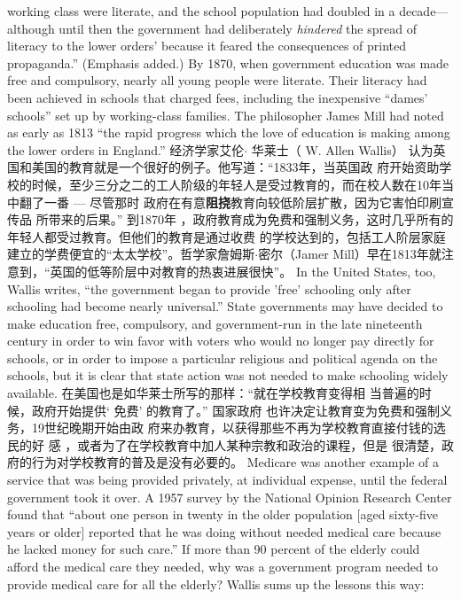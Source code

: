 \begin{paracol}{2}
working class were literate, and the school population had doubled in a decade---although until then the government had deliberately \textit{hindered} the spread of literacy to the lower orders'
because it feared the consequences of printed propaganda.''
(Emphasis added.) By 1870, when government education was
made free and compulsory, nearly all young people were literate. Their literacy had been achieved in schools that charged
fees, including the inexpensive ``dames' schools'' set up by
working-class families. The philosopher James Mill had noted
as early as 1813 ``the rapid progress which the love of education
is making among the lower orders in England.''
\switchcolumn
经济学家艾伦$\cdot$ 华莱士（ W. Allen Wallis） 认为英国和美国的教育就是一个很好的例子。他写道：“1833年，当英国政
府开始资助学校的时候，至少三分之二的工人阶级的年轻人是受过教育的，而在校人数在10年当中翻了一番 --- 尽管那时
政府在有意\textbf{阻挠}教育向较低阶层扩散，因为它害怕印刷宣传品
所带来的后果。” 到1870年 ，政府教育成为免费和强制义务，这时几乎所有的年轻人都受过教育。但他们的教育是通过收费
的学校达到的，包括工人阶层家庭建立的学费便宜的“太太学校”。哲学家詹姆斯$\cdot$密尔（Jamer Mill）早在1813年就注
意到，“英国的低等阶层中对教育的热衷进展很快”。
\switchcolumn*
In the United States, too, Wallis writes, ``the government
began to provide 'free' schooling only after schooling had become nearly universal.'' State governments may have decided to
make education free, compulsory, and government-run in the
late nineteenth century in order to win favor with voters who
would no longer pay directly for schools, or in order to impose a
particular religious and political agenda on the schools, but it is
clear that state action was not needed to make schooling widely
available.
\switchcolumn
在美国也是如华莱士所写的那样：“就在学校教育变得相
当普遍的时候，政府开始提供‘ 免费’ 的教育了。” 国家政府
也许决定让教育变为免费和强制义务，19世纪晚期开始由政
府来办教育，以获得那些不再为学校教育直接付钱的选民的好
感 ，或者为了在学校教育中加人某种宗教和政治的课程，但是
很清楚，政府的行为对学校教育的普及是没有必要的。
\switchcolumn*
Medicare was another example of a service that was being
provided privately, at individual expense, until the federal government took it over. A 1957 survey by the National Opinion
Research Center found that ``about one person in twenty in the
older population [aged sixty-five years or older] reported that
he was doing without needed medical care because he lacked
money for such care.'' If more than 90 percent of the elderly
could afford the medical care they needed, why was a government program needed to provide medical care for all the elderly? Wallis sums up the lessons this way:

\end{paracol}
